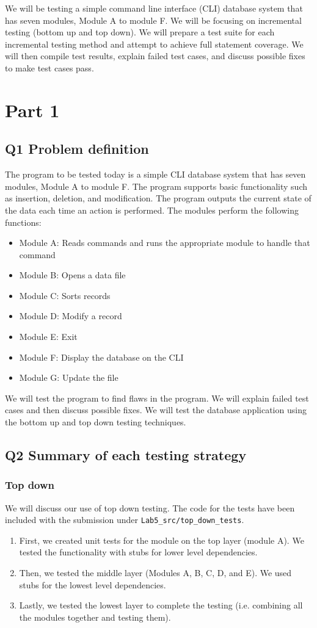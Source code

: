 \documentclass[12pt, letterpaper, titlepage]{article}
\begin{document}
We will be testing a simple command line interface (CLI) database system that has seven modules, Module A to module F. We will be focusing on incremental testing (bottom up and top down). We will prepare a test suite for each incremental testing method and attempt to achieve full statement coverage. We will then compile test results, explain failed test cases, and discuss possible fixes to make test cases pass.

\section*{Part 1}
\subsection*{Q1 Problem definition}
The program to be tested today is a simple CLI database system that has seven modules, Module A to module F. The program supports basic functionality such as insertion, deletion, and modification. The program outputs the current state of the data each time an action is performed. The modules perform the following functions:
\begin{itemize}
    \item Module A: Reads commands and runs the appropriate module to handle that command 
    \item Module B: Opens a data file 
    \item Module C: Sorts records
    \item Module D: Modify a record 
    \item Module E: Exit 
    \item Module F: Display the database on the CLI
    \item Module G: Update the file
\end{itemize}
We will test the program to find flaws in the program. We will explain failed test cases and then discuss possible fixes. We will test the database application using the bottom up and top down testing techniques.

\subsection*{Q2 Summary of each testing strategy}
\subsubsection*{Top down}
We will discuss our use of top down testing. The code for the tests have been included with the submission under \lstinline{Lab5_src/top_down_tests}.
\begin{enumerate}
    \item First, we created unit tests for the module on the top layer (module A). We tested the functionality with stubs for lower level dependencies.
    \item Then, we tested the middle layer (Modules A, B, C, D, and E). We used stubs for the lowest level dependencies.
    \item Lastly, we tested the lowest layer to complete the testing (i.e. combining all the modules together and testing them).
\end{enumerate}
\end{document}
